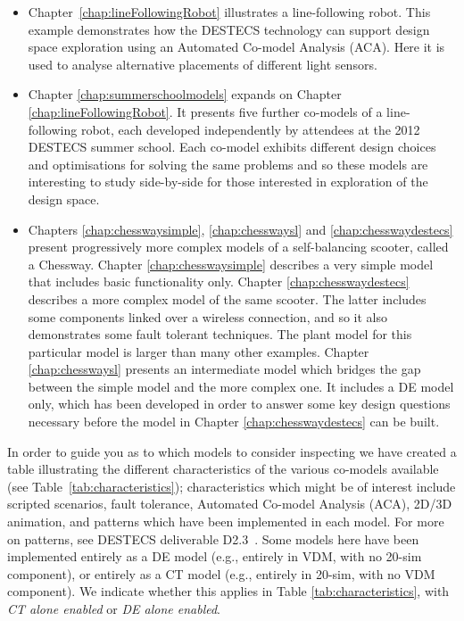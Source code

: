 \documentclass{crescendorepchap}
\begin{document}
\begin{itemize}
\item Chapter~\ref{chap:lineFollowingRobot} illustrates a
  line-following robot. This example demonstrates how the DESTECS
  technology can support design space exploration using an Automated
  Co-model Analysis (ACA). Here it is used to analyse alternative
  placements of different light sensors.
\item Chapter \ref{chap:summerschoolmodels} expands on Chapter
  \ref{chap:lineFollowingRobot}.  It presents five further co-models
  of a line-following robot, each developed independently by attendees
  at the 2012 DESTECS summer school.  Each co-model exhibits different
  design choices and optimisations for solving the same problems and
  so these models are interesting to study side-by-side for those
  interested in exploration of the design space.
\item Chapters \ref{chap:chesswaysimple}, \ref{chap:chesswaysl} and
  \ref{chap:chesswaydestecs} present progressively more complex models
  of a self-balancing scooter, called a Chessway.  Chapter
  \ref{chap:chesswaysimple} describes a very simple model that
  includes basic functionality only.  Chapter
  \ref{chap:chesswaydestecs} describes a more complex model of the
  same scooter.  The latter includes some components linked over a
  wireless connection, and so it also demonstrates some fault tolerant
  techniques.  The plant model for this particular model is larger
  than many other examples.  Chapter \ref{chap:chesswaysl} presents an
  intermediate model which bridges the gap between the simple model
  and the more complex one. It includes a DE model only, which has
  been developed in order to answer some key design questions
  necessary before the model in Chapter \ref{chap:chesswaydestecs} can
  be built.
\end{itemize}

In order to guide you as to which models to consider inspecting we
have created a table illustrating the different characteristics of the
various co-models available (see Table~\ref{tab:characteristics});
characteristics which might be of interest include scripted scenarios,
fault tolerance, Automated Co-model Analysis (ACA), 2D/3D animation,
and patterns which have been implemented in each model.  For more on
patterns, see DESTECS deliverable D2.3~\cite{DESTECSD23}.  Some models here have been implemented entirely as a DE model (e.g., entirely in VDM, with no 20-sim component), or entirely as a CT model (e.g., entirely in 20-sim, with no VDM component).  We indicate whether this applies in Table \ref{tab:characteristics}, with \emph{CT alone enabled} or \emph{DE alone enabled}.
\end{document}
